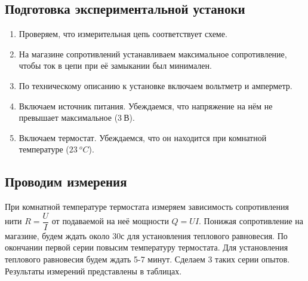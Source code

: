\documentclass[a4paper,12pt]{article}
\begin{document}
    \subsection{Подготовка экспериментальной устаноки}
        \begin{enumerate}
        \item  Проверяем, что измерительная цепь соответствует схеме.

        \item На магазине сопротивлений устанавливаем максимальное сопротивление, чтобы ток в цепи при её замыкании был минимален.

        \item По техническому описанию к установке включаем вольтметр и амперметр.

        \item Включаем источник питания. Убеждаемся, что напряжение на нём не превышает максимальное ($3 \ \text{В}$).

        \item Включаем термостат. Убеждаемся, что он находится при комнатной температуре ($23 \ ^oC$).
        \end{enumerate}

        \subsection{Проводим измерения}

         При комнатной температуре термостата измеряем зависимость сопротивления нити $R =\dfrac{U}{I}$ от подаваемой на неё мощности $Q = UI$. Понижая сопротивление на магазине, будем ждать около 30с для установления теплового равновесия. По окончании первой серии повысим температуру термостата. Для установления теплового равновесия будем ждать 5-7 минут. Сделаем 3 таких серии опытов. Результаты измерений представлены в таблицах. \\
         \newline
\end{document}
